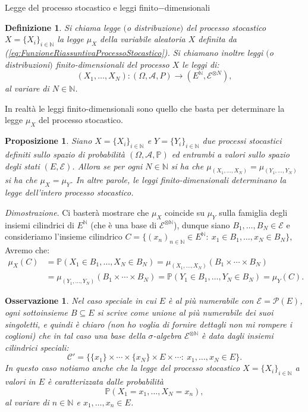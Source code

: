 \documentclass[11pt]{book}
\makeatletter
\theoremstyle{Definizione}
\newtheorem*{mydef}{Definizione}
\theoremstyle{TeoremaProposizioneLemmaCorollario}
\newtheorem{mypropo}[myteo]{Proposizione}
\theoremstyle{OsservazioneNota}
\newtheorem{myobs}{Osservazione}[section]
\renewenvironment{proof}[1][\proofname]{\par
  \normalfont \topsep6\p@\@plus6\p@\relax
  \trivlist
  \item[\hskip\labelsep
        \itshape
    #1\@addpunct{.}]\ignorespaces
}{%
  \endtrivlist\@endpefalse
}
\newcommand{\N}{\mathbb{N}}
\renewcommand{\P}{\mathbb{P}}
\renewenvironment{proof}{\textsl{Dimostrazione}.}{}
\makeatother
\begin{document}
\begin{boxdef}{Legge del processo stocastico e leggi finito$-$dimensionali}
\begin{mydef}
Si chiama legge $($o distribuzione$)$ del processo stocastico $X = \{X_i\}_{i\in \N}$ la legge $\mu_X$ della variabile aleatoria $X$ definita da \textup{(\ref{eq:FunzioneRiassuntivaProcessoStocastico})}. Si chiamano inoltre leggi $($o distribuzioni$)$ finito-dimensionali del processo $X$ le leggi di:
$$
(X_1,\dots,X_N): (\Omega,\mathcal{A},P) \longrightarrow (E^\N,\mathcal{E}^{\otimes N}),
$$
al variare di $N\in \N$.
\end{mydef}
\end{boxdef}
\noindent
In realtà le leggi finito-dimensionali sono quello che basta per determinare la legge $\mu_X$ del processo stocastico.
\begin{boxpro}
\begin{mypropo}
Siano $X = \{X_i\}_{i\in \N}$ e $Y = \{Y_i\}_{i\in \N}$ due processi stocastici definiti sullo spazio di probabilità $(\Omega,\mathcal{A},\P)$ ed entrambi a valori sullo spazio degli stati $(E,\mathcal{E})$. Allora se per ogni $N\in \N$ si ha che $\mu_{(X_1,\dots,X_N)} = \mu_{(Y_1,\dots,Y_N)}$ si ha che $\mu_X = \mu_Y$. In altre parole, le leggi finito-dimensionali determinano la legge dell'intero processo stocastico.
\end{mypropo}
\tcblower
\begin{proof}
Ci basterà mostrare che $\mu_X$ coincide su $\mu_Y$ sulla famiglia degli insiemi cilindrici di $E^\N$ (che è una base di $\mathcal{E}^{\otimes \N}$), dunque siano $B_1,\dots,B_N\in \mathcal{E}$ e consideriamo l'insieme cilindrico $C = \{(x_n)_{n\in \N}\in E^\N:\ x_1\in B_1,\dots,x_N\in B_N\}$, Avremo che:
\begin{align*}
\mu_X(C) &= \P(X_1\in B_1,\dots,X_N\in B_N) = \mu_{(X_1,\dots,X_N)}(B_1\times \cdots \times B_N) \\
&= \mu_{(Y_1,\dots,Y_N)}(B_1\times \cdots \times B_N) = \P(Y_1\in B_1,\dots,Y_N\in B_N) = \mu_Y(C).
\end{align*}
\end{proof}
\end{boxpro}
\begin{myobs}
Nel caso speciale in cui $E$ è al più numerabile con $\mathcal{E} = \mathcal{P}(E)$, ogni sottoinsieme $B\subseteq E$ si scrive come unione al più numerabile dei suoi singoletti, e quindi è chiaro (non ho voglia di fornire dettagli non mi rompere i coglioni) che in tal caso una base della $\sigma$-algebra $\mathcal{E}^{\otimes \N}$ è data dagli insiemi cilindrici speciali:
$$
\mathcal{C}' = \big\{\{x_1\}\times \cdots \times \{x_N\}\times E \times \cdots :\ x_1,\dots,x_N\in E\big\}.
$$
In questo caso notiamo anche che la legge del processo stocastico $X = \{X_i\}_{i\in \N}$ a valori in $E$ è caratterizzata dalle probabilità
$$
\P(X_1 = x_1,\dots,X_N = x_n),
$$
al variare di $n\in \N$ e $x_1,\dots,x_n\in E$.
\end{myobs}
\end{document}
